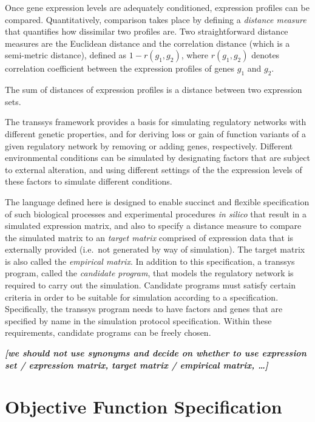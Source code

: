 \documentclass[a4paper,fleqn]{article}
\newcommand{\newterm}[1]{\emph{#1}}
\newcommand{\todo}[1]{\rule{0pt}{0pt}\marginpar{\rule{1ex}{1ex}}\textbf{\emph{[#1]}}}
\newcommand{\otherlang}[1]{\textit{#1}}
\begin{document}
Once gene expression levels are adequately conditioned, expression
profiles can be compared. Quantitatively, comparison takes place by
defining a \newterm{distance measure} that quantifies how dissimilar
two profiles are. Two straightforward distance measures are the
Euclidean distance and the correlation distance (which is a
semi-metric distance), defined as $1 - r(g_1, g_2)$, where $r(g_1,
g_2)$ denotes correlation coefficient between the expression profiles
of genes $g_1$ and $g_2$.

The sum of distances of expression profiles is a distance between two
expression sets.

The transsys framework \cite{Kim2001,transsyshome} provides a basis for simulating regulatory
networks with different genetic properties, and for deriving loss or
gain of function variants of a given regulatory network by removing or
adding genes, respectively. Different environmental conditions can be
simulated by designating factors that are subject to external
alteration, and using different settings of the the expression levels
of these factors to simulate different conditions.

The language defined here is designed to enable succinct and flexible
specification of such biological processes and experimental procedures
\otherlang{in silico} that result in a simulated expression matrix,
and also to specify a distance measure to compare the simulated matrix
to an \newterm{target matrix} comprised of expression data that is
externally provided (i.e.\ not generated by way of simulation). The
target matrix is also called the \newterm{empirical matrix}. In
addition to this specification, a transsys program, called the
\newterm{candidate program}, that models the regulatory network is
required to carry out the simulation. Candidate programs must satisfy
certain criteria in order to be suitable for simulation according to a
specification. Specifically, the transsys program needs to have
factors and genes that are specified by name in the simulation
protocol specification. Within these requirements, candidate programs
can be freely chosen.

\todo{we should not use synonyms and decide on whether to use
  expression set / expression matrix, target matrix / empirical
  matrix, \ldots}


\section{Objective Function Specification}
\end{document}

